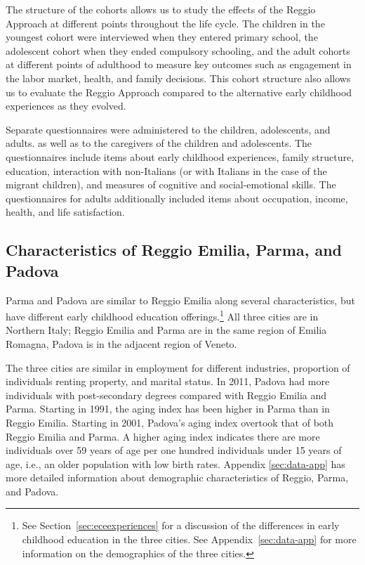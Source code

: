 The structure of the cohorts allows us to study the effects of the Reggio Approach at different points throughout the life cycle. The children in the youngest cohort were interviewed when they entered primary school, the adolescent cohort when they ended compulsory schooling, and the adult cohorts at different points of adulthood to measure key outcomes such as engagement in the labor market, health, and family decisions. This cohort structure also allows us to evaluate the Reggio Approach compared to the alternative early childhood experiences as they evolved.

Separate questionnaires were administered to the children, adolescents, and adults. as well as to the caregivers of the children and adolescents. The questionnaires include items about early childhood experiences, family structure, education, interaction with non-Italians (or with Italians in the case of the migrant children), and measures of cognitive and social-emotional skills. The questionnaires for adults additionally included items about occupation, income, health, and life satisfaction. 

\subsection{Characteristics of Reggio Emilia, Parma, and Padova}

Parma and Padova are similar to Reggio Emilia along several characteristics, but have different early childhood education offerings.\footnote{See Section~\ref{sec:eceexperiences} for a discussion of the differences in early childhood education in the three cities. See Appendix~\ref{sec:data-app} for more information on the demographics of the three cities.} All three cities are in Northern Italy; Reggio Emilia and Parma are in the same region of Emilia Romagna, Padova is in the adjacent region of Veneto. 

The three cities are similar in employment for different industries, proportion of individuals renting property, and marital status. In 2011, Padova had more individuals with post-secondary degrees compared with Reggio Emilia and Parma. Starting in 1991, the aging index has been higher in Parma than in Reggio Emilia. Starting in 2001, Padova's aging index overtook that of both Reggio Emilia and Parma. A higher aging index indicates there are more individuals over 59 years of age per one hundred individuals under 15 years of age, i.e., an older population with low birth rates. Appendix \ref{sec:data-app} has more detailed information about demographic characteristics of Reggio, Parma, and Padova. 

